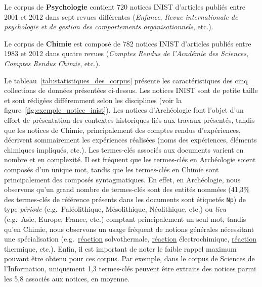   Le corpus de \textbf{Psychologie} contient 720 notices INIST d'articles
  publiés entre 2001 et 2012 dans sept revues différentes
  (\textit{Enfance}, \textit{Revue internationale de psychologie et de gestion
  des comportements organisationnels}, etc.).

  Le corpus de \textbf{Chimie} est composé de 782 notices INIST d'articles
  publiés entre 1983 et 2012 dans quatre revues (\textit{Comptes Rendus de
  l'Académie des Sciences}, \textit{Comptes Rendus Chimie}, etc.).

  Le tableau~\ref{tab:statistiques_des_corpus} présente les caractéristiques des
  cinq collections de données présentées ci-dessus.
  Les notices INIST sont de petite taille et sont rédigées différemment selon
  les disciplines (voir la figure~\ref{fig:exemple_notice_inist}). Les notices
  d'Archéologie font l'objet d'un effort de présentation des contextes
  historiques liés aux travaux présentés, tandis que les notices de Chimie,
  principalement des comptes rendus d'expériences, décrivent sommairement les
  expériences réalisées (noms des expériences, éléments chimiques impliqués,
  etc.). Les termes-clés associés aux documents varient en nombre et en
  complexité. Il est fréquent que les termes-clés en Archéologie soient composés
  d'un unique mot, tandis que les termes-clés en Chimie sont principalement des
  composés syntagmatiques. En effet, en Archéologie, nous observons qu'un grand
  nombre de termes-clés sont des entités nommées (41,3\% des termes-clés de
  référence présents dans les documents sont étiquetés \texttt{Np}) de type
  \textit{période} (e.g.~\og{}Paléolithique\fg{}, \og{}Mésolithique\fg{},
  \og{}Néolithique\fg{}, etc.) ou \textit{lieu} (e.g.~\og{}Asie\fg{},
  \og{}Europe\fg{}, \og{}France\fg{}, etc.) comptant principalement un seul mot,
  tandis qu'en Chimie, nous observons un usage fréquent de notions générales
  nécessitant une spécialisation (e.g.~\og{}\underline{réaction}
  solvothermale\fg{}, \og{}\underline{réaction} électrochimique\fg{},
  \og{}\underline{réaction} thermique\fg{}, etc.). Enfin, il est important de
  noter le faible rappel maximum pouvant être obtenu pour ces corpus. Par
  exemple, dans le corpus de Sciences de l'Information, uniquement 1,3
  termes-clés peuvent être extraits des notices parmi les 5,8 associés aux
  notices, en moyenne.
